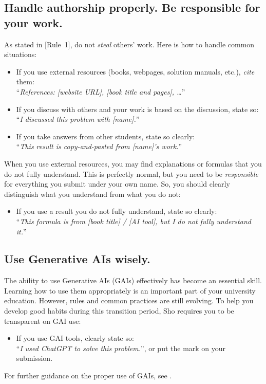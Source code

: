 \documentclass[11pt,pdfa,lastpage,minititle]{MishoNote}
\def\RUL#1{\textsf{[Rule~#1]}}
\def\SAMPLE#1{``\textit{#1}''}
\begin{document}
\subsection{Handle authorship properly. Be responsible for your work.}
As stated in \RUL{1}, do not \emph{steal} others' work.
Here is how to handle common situations:
\begin{itemize}
  \item If you use external resources (books, webpages, solution manuals, etc.), \emph{cite} them:\\\SAMPLE{References: [website URL], [book title and pages], \dots}
  \item If you discuss with others and your work is based on the discussion, state so:\\\SAMPLE{I discussed this problem with [name].}
  \item If you take answers from other students, state so clearly:\\\SAMPLE{This result is copy-and-pasted from [name]'s work.}
\end{itemize}
When you use external resources, you may find explanations or formulas that you do not fully understand. This is perfectly normal, but you need to be \emph{responsible} for everything you submit under your own name.
So, you should clearly distinguish what you understand from what you do not:
\begin{itemize}
  \item If you use a result you do not fully understand, state so clearly:\\\SAMPLE{This formula is from [book title] / [AI tool], but I do not fully understand it.}
\end{itemize}

\subsection{Use Generative AIs wisely.}
The ability to use Generative AIs (GAIs) effectively has become an essential skill.
Learning how to use them appropriately is an important part of your university education.
However, rules and common practices are still evolving.
To help you develop good habits during this transition period, Sho requires you to be transparent on GAI use:
\begin{itemize}
  \item If you use GAI tools, clearly state so:\\\SAMPLE{I used ChatGPT to solve this problem.}, or put the mark {\color{pBlue}} on your submission.
\end{itemize}
For further guidance on the proper use of GAIs, see .
\end{document}
